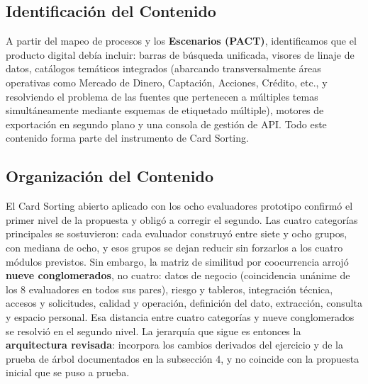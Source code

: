 \subsection{Identificación del Contenido}
A partir del mapeo de procesos y los \textbf{Escenarios (PACT)}, identificamos que el producto digital debía incluir: barras de búsqueda unificada, visores de linaje de datos, catálogos temáticos integrados (abarcando transversalmente áreas operativas como Mercado de Dinero, Captación, Acciones, Crédito, etc., y resolviendo el problema de las fuentes que pertenecen a múltiples temas simultáneamente mediante esquemas de etiquetado múltiple), motores de exportación en segundo plano y una consola de gestión de API. Todo este contenido forma parte del instrumento de Card Sorting.

\subsection{Organización del Contenido}
El Card Sorting abierto aplicado con los ocho evaluadores prototipo confirmó el primer nivel de la propuesta y obligó a corregir el segundo. Las cuatro categorías principales se sostuvieron: cada evaluador construyó entre siete y ocho grupos, con mediana de ocho, y esos grupos se dejan reducir sin forzarlos a los cuatro módulos previstos. Sin embargo, la matriz de similitud por coocurrencia arrojó \textbf{nueve conglomerados}, no cuatro: datos de negocio (coincidencia unánime de los 8 evaluadores en todos sus pares), riesgo y tableros, integración técnica, accesos y solicitudes, calidad y operación, definición del dato, extracción, consulta y espacio personal. Esa distancia entre cuatro categorías y nueve conglomerados se resolvió en el segundo nivel. La jerarquía que sigue es entonces la \textbf{arquitectura revisada}: incorpora los cambios derivados del ejercicio y de la prueba de árbol documentados en la subsección 4, y no coincide con la propuesta inicial que se puso a prueba.

